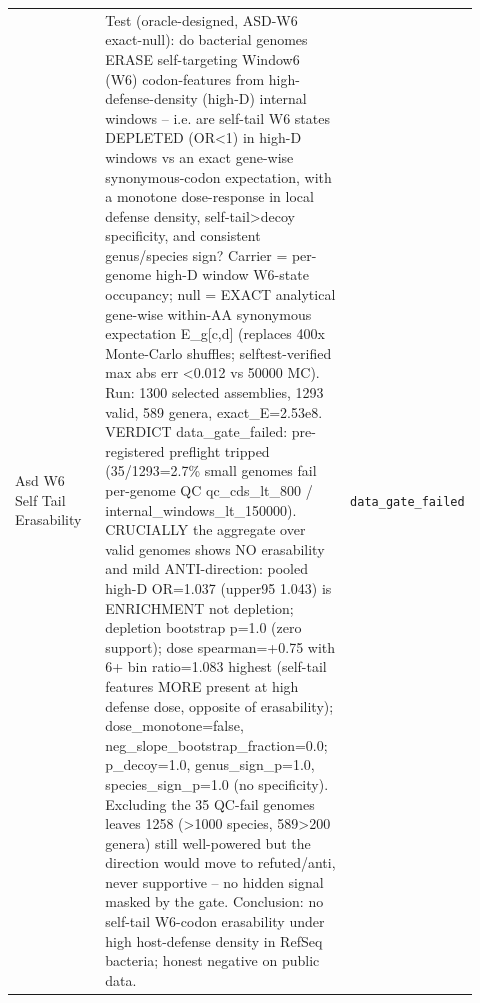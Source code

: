 \begin{longtable}{>{\raggedright\arraybackslash}p{0.22\linewidth}>{\raggedright\arraybackslash}p{0.55\linewidth}>{\raggedright\arraybackslash}p{0.15\linewidth}}
Asd W6 Self Tail Erasability & Test (oracle-designed, ASD-W6 exact-null): do bacterial genomes ERASE self-targeting Window6 (W6) codon-features from high-defense-density (high-D) internal windows -- i.e. are self-tail W6 states DEPLETED (OR<1) in high-D windows vs an exact gene-wise synonymous-codon expectation, with a monotone dose-response in local defense density, self-tail>decoy specificity, and consistent genus/species sign? Carrier = per-genome high-D window W6-state occupancy; null = EXACT analytical gene-wise within-AA synonymous expectation E\_g[c,d] (replaces 400x Monte-Carlo shuffles; selftest-verified max abs err <0.012 vs 50000 MC). Run: 1300 selected assemblies, 1293 valid, 589 genera, exact\_E=2.53e8. VERDICT data\_gate\_failed: pre-registered preflight tripped (35/1293=2.7\% small genomes fail per-genome QC qc\_cds\_lt\_800 / internal\_windows\_lt\_150000). CRUCIALLY the aggregate over valid genomes shows NO erasability and mild ANTI-direction: pooled high-D OR=1.037 (upper95 1.043) is ENRICHMENT not depletion; depletion bootstrap p=1.0 (zero support); dose spearman=+0.75 with 6+ bin ratio=1.083 highest (self-tail features MORE present at high defense dose, opposite of erasability); dose\_monotone=false, neg\_slope\_bootstrap\_fraction=0.0; p\_decoy=1.0, genus\_sign\_p=1.0, species\_sign\_p=1.0 (no specificity). Excluding the 35 QC-fail genomes leaves 1258 (>1000 species, 589>200 genera) still well-powered but the direction would move to refuted/anti, never supportive -- no hidden signal masked by the gate. Conclusion: no self-tail W6-codon erasability under high host-defense density in RefSeq bacteria; honest negative on public data. & \texttt{data\_gate\_failed} \\

\end{longtable}
